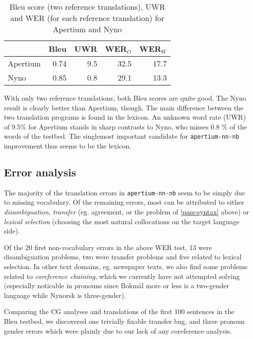 \documentclass[11pt]{article}
\begin{document}
\begin{table}[htdp]
  \caption{{\sc Bleu} score (two reference translations), UWR and WER (for each reference translation) for Apertium and Nyno}
\begin{center}
\begin{tabular}{|l|r|r|r|r|}
  \hline
  & {\sc Bleu} & UWR  & WER$_{O}$ & WER$_{W}$ \\
  \hline					 
  Apertium    & 0.74       & 9.5 & 32.5 & 17.7\\
  Nyno        & 0.85       & 0.8 & 29.1 &13.3 \\
  \hline
\end{tabular}
\end{center}
\label{bleu}
\end{table}%

With only two reference translations, both {\sc Bleu} scores are quite
good. The Nyno result is clearly better than Apertium, though. The
main difference between the two translation programs is found in the
lexicon. An unknown word rate (UWR) of 9.5\% for Apertium stands in
sharp
contrasts to Nyno, who misses 0.8 \% of the words of the testbed.
The singlemost important candidate for {\tt apertium-nn-nb}
improvement thus seems to be the lexicon.


\subsection{Error analysis}
The majority of the translation errors in {\tt apertium-nn-nb} seem to
be simply due to missing vocabulary. Of the remaining errors, most can
be attributed to either \emph{disambiguation}, \emph{transfer} (eg.
agreement, or the problem of \ref{pass-syntax} above) or \emph{lexical
  selection} (choosing the most natural collocations on the target
language side).

Of the 20 first non-vocabulary errors in the above WER test, 13 were
disambiguation problems, two were transfer problems and five related
to lexical selection. In other text domains, eg. newspaper texts, we
also find some problems related to \emph{coreference chaining}, which
we currently have not attempted solving (especially noticable in
pronouns since Bokmål more or less is a two-gender language while
Nynorsk is three-gender). 

Comparing the CG analyses and translations of the first 100 sentences
in the {\sc Bleu} testbed, we discovered one trivially fixable
transfer bug, and three pronoun gender errors which were plainly due
to our lack of any coreference analysis.
\end{document}
